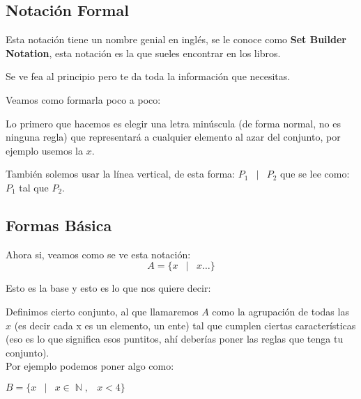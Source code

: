 \documentclass[12pt, fleqn]{report}                             %
\DeclareMathOperator \Space {\quad}                             %
\DeclareMathOperator \MiniSpace {\;}                            %
\newcommand \Such {\MiniSpace|\MiniSpace}                       %
\DeclareMathOperator \Naturals  {\mathbb{N}}                     %
\begin{document}
                \clearpage
                \subsection{Notación Formal} 

                    Esta notación tiene un nombre genial en inglés, se le conoce como \textbf{Set Builder Notation},
                    esta notación es la que sueles encontrar en los libros. 

                    Se ve fea al principio pero te da toda la información que necesitas.

                    Veamos como formarla poco a poco:

                    Lo primero que hacemos es elegir una letra minúscula (de forma normal, no es ninguna regla)
                    que representará a cualquier elemento al azar del conjunto, por ejemplo usemos la $x$.

                    También solemos usar la línea vertical, de esta forma: $P_1 \Such P_2$ que se lee como: 
                    $P_1$ tal que $P_2$.  

                    \subsection*{Formas Básica}

                        Ahora si, veamos como se ve esta notación:
                        \begin{equation}   
                            A = \{ x \Such x \dots \}
                        \end{equation}

                        Esto es la base y esto es lo que nos quiere decir:

                        Definimos cierto conjunto, al que llamaremos $A$ como la agrupación de todas las $x$
                        (es decir cada x es un elemento, un ente) tal que cumplen ciertas características
                        (eso es lo que significa esos puntitos, ahí deberías poner las reglas que tenga
                        tu conjunto). \\

                        Por ejemplo podemos poner algo como:

                        $B = \{ x \Such x \in \Naturals, \MiniSpace x < 4 \}$\\
\end{document}
